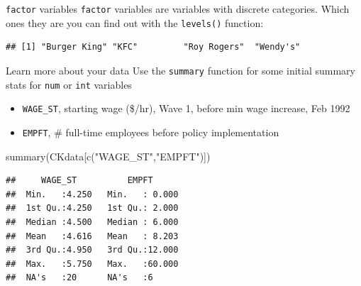 \documentclass[
  ignorenonframetext,
]{beamer}
\newenvironment{Shaded}{\begin{snugshade}}{\end{snugshade}}
\newcommand{\FunctionTok}[1]{\textcolor[rgb]{0.00,0.00,0.00}{#1}}
\newcommand{\NormalTok}[1]{#1}
\newcommand{\SpecialCharTok}[1]{\textcolor[rgb]{0.00,0.00,0.00}{#1}}
\newcommand{\StringTok}[1]{\textcolor[rgb]{0.31,0.60,0.02}{#1}}
\providecommand{\tightlist}{%
  \setlength{\itemsep}{0pt}\setlength{\parskip}{0pt}}
\begin{document}
\begin{frame}[fragile]{\texttt{factor} variables}
\protect\hypertarget{variables-2}{}
\texttt{factor} variables are variables with discrete categories. Which
ones they are you can find out with the \texttt{levels()} function:

\begin{Shaded}
\end{Shaded}

\begin{verbatim}
## [1] "Burger King" "KFC"         "Roy Rogers"  "Wendy's"
\end{verbatim}
\end{frame}

\begin{frame}[fragile]{Learn more about your data}
\protect\hypertarget{learn-more-about-your-data}{}
Use the \texttt{summary} function for some initial summary stats for
\texttt{num} or \texttt{int} variables

\begin{itemize}
\tightlist
\item
  \texttt{WAGE\_ST}, starting wage (\$/hr), Wave 1, before min wage
  increase, Feb 1992
\item
  \texttt{EMPFT}, \# full-time employees before policy implementation
\end{itemize}

\footnotesize

\begin{Shaded}
\begin{Highlighting}[]
\FunctionTok{summary}\NormalTok{(CKdata[}\FunctionTok{c}\NormalTok{(}\StringTok{"WAGE\_ST"}\NormalTok{,}\StringTok{"EMPFT"}\NormalTok{)])}
\end{Highlighting}
\end{Shaded}

\begin{verbatim}
##     WAGE_ST          EMPFT       
##  Min.   :4.250   Min.   : 0.000  
##  1st Qu.:4.250   1st Qu.: 2.000  
##  Median :4.500   Median : 6.000  
##  Mean   :4.616   Mean   : 8.203  
##  3rd Qu.:4.950   3rd Qu.:12.000  
##  Max.   :5.750   Max.   :60.000  
##  NA's   :20      NA's   :6
\end{verbatim}

\normalsize
\end{frame}
\end{document}
